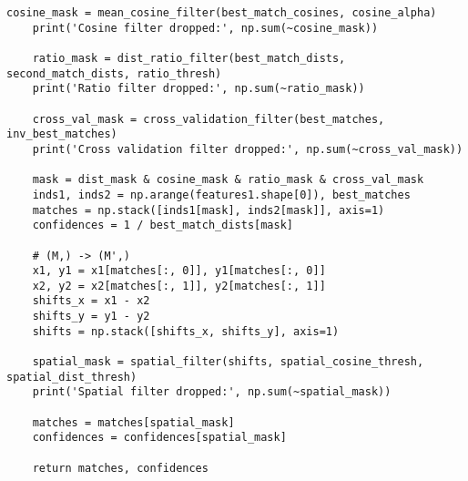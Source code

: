 \begin{lstlisting}[style=Python]
    cosine_mask = mean_cosine_filter(best_match_cosines, cosine_alpha)
    print('Cosine filter dropped:', np.sum(~cosine_mask))

    ratio_mask = dist_ratio_filter(best_match_dists, second_match_dists, ratio_thresh)
    print('Ratio filter dropped:', np.sum(~ratio_mask))

    cross_val_mask = cross_validation_filter(best_matches, inv_best_matches)
    print('Cross validation filter dropped:', np.sum(~cross_val_mask))

    mask = dist_mask & cosine_mask & ratio_mask & cross_val_mask
    inds1, inds2 = np.arange(features1.shape[0]), best_matches
    matches = np.stack([inds1[mask], inds2[mask]], axis=1)
    confidences = 1 / best_match_dists[mask]

    # (M,) -> (M',) 
    x1, y1 = x1[matches[:, 0]], y1[matches[:, 0]]
    x2, y2 = x2[matches[:, 1]], y2[matches[:, 1]]
    shifts_x = x1 - x2
    shifts_y = y1 - y2
    shifts = np.stack([shifts_x, shifts_y], axis=1)

    spatial_mask = spatial_filter(shifts, spatial_cosine_thresh, spatial_dist_thresh)
    print('Spatial filter dropped:', np.sum(~spatial_mask))

    matches = matches[spatial_mask]
    confidences = confidences[spatial_mask]
    
    return matches, confidences
\end{lstlisting}